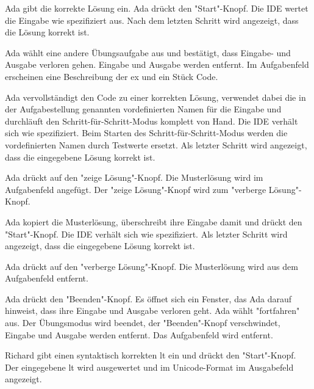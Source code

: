 \documentclass[parskip=full,11pt,twoside]{scrartcl}
\begin{document}
{Ada gibt die korrekte Lösung ein. Ada drückt den "Start"-Knopf.}
{Die IDE wertet die Eingabe wie spezifiziert aus.
 Nach dem letzten Schritt wird angezeigt, dass die Lösung korrekt ist.}
 
{Ada wählt eine andere Übungsaufgabe aus und bestätigt, dass Eingabe- und Ausgabe verloren gehen.}
{Eingabe und Ausgabe werden entfernt.
Im Aufgabenfeld erscheinen eine Beschreibung der \gls{ex} und ein Stück Code.}

{Ada vervollständigt den Code zu einer korrekten Lösung, verwendet dabei die in der Aufgabestellung genannten vordefinierten Namen für die Eingabe und durchläuft den Schritt-für-Schritt-Modus komplett von Hand.}
{Die IDE verhält sich wie spezifiziert. Beim Starten des Schritt-für-Schritt-Modus werden die vordefinierten Namen durch Testwerte ersetzt.
 Als letzter Schritt wird angezeigt, dass die eingegebene Lösung korrekt ist.}

{Ada drückt auf den "zeige Lösung"-Knopf.}
{Die Musterlösung wird im Aufgabenfeld angefügt.
 Der "zeige Lösung"-Knopf wird zum "verberge Lösung"-Knopf.}

{Ada kopiert die Musterlösung, überschreibt ihre Eingabe damit und drückt den "Start"-Knopf.}
{Die IDE verhält sich wie spezifiziert. 
 Als letzter Schritt wird angezeigt, dass die eingegebene Lösung korrekt ist.}
 
{Ada drückt auf den "verberge Lösung"-Knopf.}
{Die Musterlösung wird aus dem Aufgabenfeld entfernt.}
 
{Ada drückt den "Beenden"-Knopf.}
{Es öffnet sich ein Fenster, das Ada darauf hinweist, dass ihre Eingabe und Ausgabe verloren geht.
 Ada wählt "fortfahren" aus.
 Der Übungsmodus wird beendet, der "Beenden"-Knopf verschwindet, Eingabe und Ausgabe werden entfernt.
 Das Aufgabenfeld wird entfernt.}


{Richard gibt einen syntaktisch korrekten \gls{lt} ein und drückt den "Start"-Knopf.}
{Der eingegebene \gls{lt} wird ausgewertet und im Unicode-Format im Ausgabefeld angezeigt.}
\end{document}

